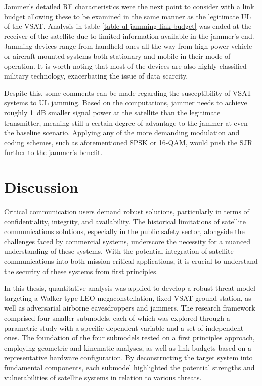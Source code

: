 \documentclass[english, 12pt, a4paper, elec, utf8, a-1b, online]{aaltothesis}
\begin{document}
Jammer's detailed RF characteristics were the next point to consider with a link budget allowing these to be examined in the same manner as the legitimate UL of the VSAT.
Analysis in table \ref{table-ul-jamming-link-budget} was ended at the receiver of the satellite due to limited information available in the jammer's end.
Jamming devices range from handheld ones all the way from high power vehicle or aircraft mounted systems both stationary and mobile in their mode of operation.
It is worth noting that most of the devices are also highly classified military technology, exacerbating the issue of data scarcity.

Despite this, some comments can be made regarding the susceptibility of VSAT systems to UL jamming.
Based on the computations, jammer needs to achieve roughly \SI{1}{\deci\bel} smaller signal power at the satellite than the legitimate transmitter, meaning still a certain degree of advantage to the jammer at even the baseline scenario.
Applying any of the more demanding modulation and coding schemes, such as aforementioned 8PSK or 16-QAM, would push the SJR further to the jammer's benefit.

\clearpage

\section{Discussion}

Critical communication users demand robust solutions, particularly in terms of confidentiality, integrity, and availability.
The historical limitations of satellite communications solutions, especially in the public safety sector, alongside the challenges faced by commercial systems, underscore the necessity for a nuanced understanding of these systems.
With the potential integration of satellite communications into both mission-critical applications, it is crucial to understand the security of these systems from first principles.

In this thesis, quantitative analysis was applied to develop a robust threat model targeting a Walker-type LEO megaconstellation, fixed VSAT ground station, as well as adversarial airborne eavesdroppers and jammers. The research framework comprised four smaller submodels, each of which was explored through a parametric study with a specific dependent variable and a set of independent ones.
The foundation of the four submodels rested on a first principles approach, employing geometric and kinematic analyses, as well as link budgets based on a representative hardware configuration.
By deconstructing the target system into fundamental components, each submodel highlighted the potential strengths and vulnerabilities of satellite systems in relation to various threats.
\end{document}

